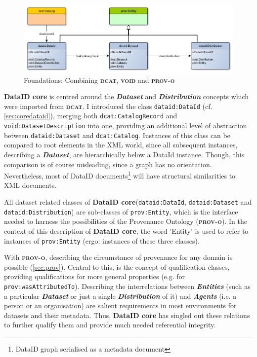 \documentclass[a4paper,english,twoside,BCOR1.5cm,headsepline,DIV12,appendixprefix,final,12pt]{scrbook}
\newcommand{\core}{{\ttfamily\bfseries DataID core}\xspace}
\newcommand{\prov}{{\scshape\bfseries prov-o}\xspace}
\newcommand{\void}{{\scshape\bfseries void}\xspace}
\newcommand{\dcat}{{\scshape\bfseries dcat}\xspace}
\newcommand{\prop}[1]{{{\texttt{#1}}}}
\newcommand{\important}[1]{\textbf{\textit{#1}}}
\begin{document}
\begin{figure}[!htbp]
\centering
  \includegraphics[width=\textwidth]{images/FoundationalConcept.png}
  \caption{Foundations: Combining \dcat, \void and \prov}
  \label{fig:foundations}
\end{figure}

\core is centred around the \important{Dataset} and \important{Distribution} concepts which were imported from \dcat. I introduced the class \prop{dataid:DataId} (cf. \cref{sec:coredataid}), merging both \prop{dcat:CatalogRecord} and \prop{void:DatasetDescription} into one, providing an additional level of abstraction between \prop{dataid:Dataset} and \prop{dcat:Catalog}. Instances of this class can be compared to root elements in the XML world, since all subsequent instances, describing a \important{Dataset}, are hierarchically below a DataId instance. Though, this comparison is of course misleading, since a graph has no orientation. Nevertheless, most of DataID documents\footnote{DataID graph serialised as a metadata document} will have structural similarities to XML documents.

All dataset related classes of \core (\prop{dataid:DataId}, \prop{dataid:Dataset} and \prop{dataid:Distribution}) are sub-classes of \prop{prov:Entity}, which is the interface needed to harness the possibilities of the Provenance Ontology (\prov). In the context of this description of \core, the word 'Entity' is used to refer to instances of \prop{prov:Entity} (ergo: instances of these three classes).

With \prov, describing the circumstance of provenance for any domain is possible (\cref{sec:prov}). Central to this, is the concept of qualification classes, providing qualifications for more general properties (e.g. for \prop{prov:wasAttributedTo}). Describing the interrelations between \important{Entities} (such as a particular \important{Dataset} or just a single \important{Distribution} of it) and \important{Agents} (i.e. a person or an organisation) are salient requirements in most environments for datasets and their metadata. Thus, \core has singled out these relations to further qualify them and provide much needed referential integrity.
\end{document}
